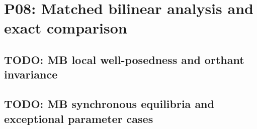 
\section{P08: Matched bilinear analysis and exact comparison}
\label{sec:P08}

\subsection{TODO: MB local well-posedness and orthant invariance}
\label{slot:P08-1}

\subsection{TODO: MB synchronous equilibria and exceptional parameter cases}
\label{slot:P08-2}

